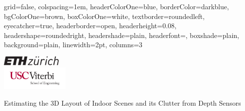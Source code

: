 \documentclass[a0paper,landscape,final]{baposter}
\begin{document}

\begin{poster}{
  grid=false,
  colspacing=1em,
  headerColorOne=blue,
  borderColor=darkblue,
  bgColorOne=brown,
  boxColorOne=white,
  textborder=roundedleft,
  eyecatcher=true,
  headerborder=open,
  headerheight=0.08\textheight,
  headershape=roundedright,
  headershade=plain,
  headerfont=\Large\textsf, %
  boxshade=plain,
  background=plain,
  linewidth=2pt,
  columns=3
  }
  {{\begin{minipage}{1.5cm}
    \vspace{0.5cm}
	\includegraphics[width=3cm]{ethzlogo_short} \\
    \includegraphics[width = 3.35cm]{usclogo2.pdf}
\end{minipage}}
  } %
  {\sf %
  {\huge Estimating the 3D Layout of Indoor Scenes and its Clutter from Depth Sensors}}

\end{poster}
\end{document}
